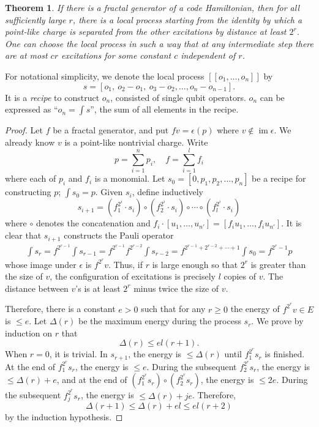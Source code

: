 \documentclass[letterpaper,12pt]{amsart}
\newtheorem{theorem}{Theorem}
\theoremstyle{definition} \newtheorem{defn}{Definition}
\theoremstyle{definition} \newtheorem{rem}{Remark}
\theoremstyle{definition} \newtheorem{example}{Example}
\newcommand{\im}{\mathop{\mathrm{im}}}
\begin{document}
\begin{theorem}
\cite{NewmanMoore1999Glassy}
If there is a fractal generator of a code Hamiltonian,
then for all sufficiently large $r$,
there is a local process starting from the identity
by which a point-like charge is separated from the other excitations by distance at least $2^r$.
One can choose the local process in such a way that at any intermediate step
there are at most $c r$ excitations for some constant $c$ independent of $r$.
\label{thm:logarithmic-energy-barrier-for-fractal-operator}
\end{theorem}
For notational simplicity, we denote the local process $[[o_1,\ldots,o_n]]$
by
\[
s = [o_1,~ o_2-o_1,~ o_3 - o_2, \ldots, o_n - o_{n-1}].
\]
It is a {\em recipe} to construct $o_n$, consisted of single qubit operators.
$o_n$ can be expressed as ``$o_n = \int s$'', the sum of all elements in the recipe.
\begin{proof}
Let $f$ be a fractal generator, 
and put $fv = \epsilon (p)$
where $v \notin \im \epsilon$.
We already know $v$ is a point-like nontrivial charge.
Write
\[
 p = \sum_{i=1}^n p_i, \quad f = \sum_{i=1}^l f_i
\]
where each of $p_i$ and $f_i$ is a monomial.
Let $s_0 = [ 0, p_1, p_2, \ldots, p_{n}]$ be a recipe for constructing $p$; $\int s_0 = p$.
Given $s_i$, define inductively
\[
 s_{i+1} = (f_1^{2^i} \cdot s_i) \circ (f_2^{2^i} \cdot s_i) \circ \cdots \circ (f_l^{2^i} \cdot s_i) 
\]
where $\circ$ denotes the concatenation and $f_i \cdot [u_1,\ldots,u_{n'}] = [f_i u_1, \ldots, f_i u_{n'}]$.
It is clear that $s_{i+1}$ constructs the Pauli operator
\begin{align*}
\int s_{r} 
= f^{2^{r-1}} \int s_{r-1} = f^{2^{r-1}} f^{2^{r-2}} \int s_{r-2} 
= f^{2^{r-1} + 2^{r-2} + \cdots + 1} \int s_0 = f^{2^r-1} p 
\end{align*}
whose image under $\epsilon$ is $f^{2^r}v$. 
Thus, if $r$ is large enough so that $2^r$ is greater than the size of $v$,
the configuration of excitations is precisely $l$ copies of $v$.
The distance between $v$'s is at least $2^r$ minus twice the size of $v$.

Therefore, there is a constant $e > 0$ such that for any $r \ge 0$
the energy of $f^{2^r}v \in E$ is $\le e$.
Let $\Delta(r)$ be the maximum energy during the process $s_r$.
We prove by induction on $r$ that 
\[
\Delta(r) \le el (r+1).
\]
When $r = 0$, it is trivial.
In $s_{r+1}$, the energy is $\le \Delta(r)$ until $f_1^{2^r} s_r$ is finished.
At the end of $f_1^{2^r} s_r$, the energy is $\le e $.
During the subsequent $f_2^{2^r} s_r$, the energy is $\le \Delta(r) + e$,
and at the end of $(f_1^{2^r} s_r) \circ (f_2^{2^r} s_r)$, the energy is $\le 2 e$.
During the subsequent $f_j^{2^r} s_r$, the energy is $\le \Delta(r) + je$.
Therefore, 
\[
\Delta(r+1) \le \Delta(r) + el \le el(r+2)
\]
by the induction hypothesis.
\end{proof}
\end{document}
